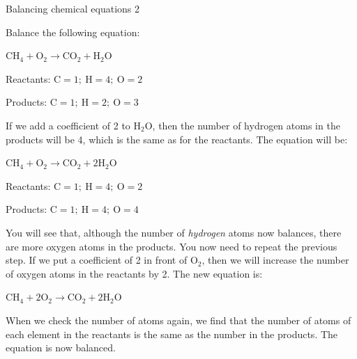 \begin{wex}{Balancing chemical equations 2}{Balance the following equation:
\begin{center}
${\text{CH}_{4} + \text{O}_{2} \rightarrow \text{CO}_{2} + \text{H}_{2}\text{O}}$
\end{center}
}{

Reactants: $\text{C} = 1;~ \text{H} = 4;~ \text{O} = 2$

Products: $\text{C} = 1;~ \text{H} = 2;~ \text{O} = 3$



If we add a coefficient of 2 to $\text{H}_{2}\text{O}$, then the number of hydrogen atoms in the products will be 4, which is the same as for the reactants. The equation will be:

\begin{center}
${\text{CH}_{4} + \text{O}_{2} \rightarrow \text{CO}_{2} + 2\text{H}_{2}\text{O}}$\\
\end{center}


Reactants: $\text{C} = 1;~ \text{H} = 4;~ \text{O} = 2$

Products: $\text{C} = 1;~ \text{H} = 4; ~\text{O} = 4$

You will see that, although the number of \textit{hydrogen} atoms now balances, there are more oxygen atoms in the products. You now need to repeat the previous step. If we put a coefficient of 2 in front of $\text{O}_{2}$, then we will increase the number of oxygen atoms in the reactants by 2. The new equation is:

\begin{center}
${\text{CH}_{4} + 2\text{O}_{2} \rightarrow \text{CO}_{2} + 2\text{H}_{2}\text{O}}$
\end{center}

When we check the number of atoms again, we find that the number of atoms of each element in the reactants is the same as the number in the products. The equation is now balanced.
}
\end{wex}
      \noindent
